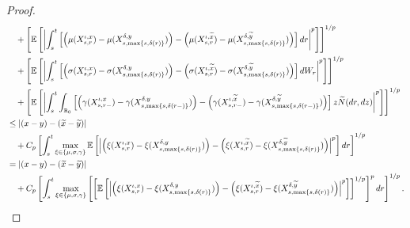\documentclass[11pt]{article}
\theoremstyle{theorem}
\theoremstyle{definition}
\newcommand{\bR}{\mathbb{R}}
\newcommand{\1}{{\bf 1}}
\begin{document}
\begin{proof}
\begin{align}
   &\quad +\left[\mathbb{E}\left[\left|  \int_s^t \left[ \left( \mu(X_{s,r}^{\iota,x}) -\mu(X_{s,\max\{s,\delta(r)\}}^{\delta,y}) \right) - \left(\mu(X_{s,r}^{\iota,\widetilde{x}}) -\mu(X_{s,\max\{s,\delta(r)\}}^{\delta,\widetilde{y}}) \right) \right] dr  \right|^p\right]\right]^{1/p}   \notag\\
   & \quad+ \left[\mathbb{E}\left[\left| \int_s^t \left[ \left(\sigma(X_{s,r}^{\iota,x}) -\sigma(X_{s,\max\{s,\delta(r)\}}^{\delta,y}) \right) - \left(\sigma(X_{s,r}^{\iota,\widetilde{x}}) -\sigma(X_{s,\max\{s,\delta(r)\}}^{\delta,\widetilde{y}}) \right) \right] dW_r   \right|^p\right]\right]^{1/p} 
 \notag\\
    &\quad + \left[\mathbb{E}\left[\left| \int_s^t \int_{\bR_0} \left[ \left(\gamma(X_{s,r-}^{\iota,x}) -\gamma (X_{s,\max\{s,\delta(r-)\}}^{\delta,y}) \right) - \left(\gamma(X_{s,r-}^{\iota,\widetilde{x}}) -\gamma (X_{s,\max\{s,\delta(r-)\}}^{\delta,\widetilde{y}}) \right) \right] z \widetilde{N}(dr, dz)\right|^p\right]\right]^{1/p}\notag\\ 
    & \leq |(x-y)-(\widetilde{x}-\widetilde{y})|   \notag\\
& \quad + C_p   \left[ \int_s^t \max_{\xi \in \{\mu, \sigma, \gamma\}} \mathbb{E}\left[\left|\left(\xi(X^{\iota, x}_{s,r})-\xi(X^{\delta,y}_{s,\max \{s, \delta(r)\}})\right) - \left(\xi(X^{\iota, \widetilde{x}}_{s,r})-\xi(X^{\delta, \widetilde{y}}_{s,\max \{s, \delta(r)\}})\right)\right|^p\right] dr\right]^{1/p} \notag\\
    & = |(x-y)-(\widetilde{x}-\widetilde{y})|   \notag\\
 & \quad + C_p  \left[ \int_s^t \max_{\xi \in \{\mu, \sigma, \gamma\}} \left [\left [\mathbb{E}\left[\left|\left(\xi(X^{\iota, x}_{s,r})-\xi(X^{\delta,y}_{s,\max \{s, \delta(r)\}})\right) - \left(\xi(X^{\iota, \widetilde{x}}_{s,r})-\xi(X^{\delta, \widetilde{y}}_{s,\max \{s, \delta(r)\}})\right)\right|^p\right]\right]^{1/p}\right]^p dr\right]^{1/p}. 
\label{idelxy}
\end{align}

\end{proof}
\end{document}
